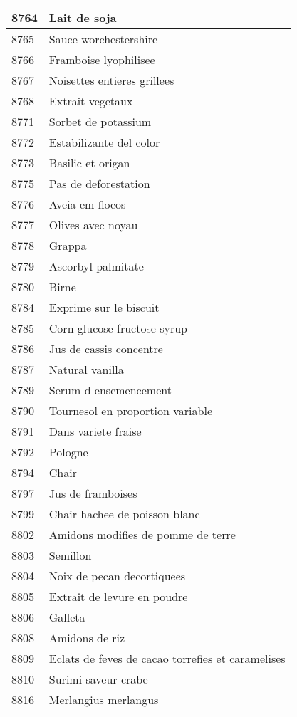 \begin{longtable}{|l|l|}
8764 & Lait de soja \\ \hline 
8765 & Sauce worchestershire \\ \hline 
8766 & Framboise lyophilisee \\ \hline 
8767 & Noisettes entieres grillees \\ \hline 
8768 & Extrait vegetaux \\ \hline 
8771 & Sorbet de potassium \\ \hline 
8772 & Estabilizante del color \\ \hline 
8773 & Basilic et origan \\ \hline 
8775 & Pas de deforestation \\ \hline 
8776 & Aveia em flocos \\ \hline 
8777 & Olives avec noyau \\ \hline 
8778 & Grappa \\ \hline 
8779 & Ascorbyl palmitate \\ \hline 
8780 & Birne \\ \hline 
8784 & Exprime sur le biscuit \\ \hline 
8785 & Corn glucose fructose syrup \\ \hline 
8786 & Jus de cassis concentre \\ \hline 
8787 & Natural vanilla \\ \hline 
8789 & Serum d ensemencement \\ \hline 
8790 & Tournesol en proportion variable \\ \hline 
8791 & Dans variete fraise \\ \hline 
8792 & Pologne \\ \hline 
8794 & Chair \\ \hline 
8797 & Jus de framboises \\ \hline 
8799 & Chair hachee de poisson blanc \\ \hline 
8802 & Amidons modifies de pomme de terre \\ \hline 
8803 & Semillon \\ \hline 
8804 & Noix de pecan decortiquees \\ \hline 
8805 & Extrait de levure en poudre \\ \hline 
8806 & Galleta \\ \hline 
8808 & Amidons de riz \\ \hline 
8809 & Eclats de feves de cacao torrefies et caramelises \\ \hline 
8810 & Surimi saveur crabe \\ \hline 
8816 & Merlangius merlangus \\ \hline 

\end{longtable}
